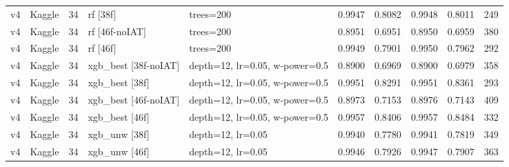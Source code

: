{\begin{longtable}{llrp{3.2cm}p{4.4cm}rrrrr}
v4 & Kaggle & 34 & rf [38f] & trees=200 & 0.9947 & 0.8082 & 0.9948 & 0.8011 & 249 \\
v4 & Kaggle & 34 & rf [46f-noIAT] & trees=200 & 0.8951 & 0.6951 & 0.8950 & 0.6959 & 380 \\
v4 & Kaggle & 34 & rf [46f] & trees=200 & 0.9949 & 0.7901 & 0.9950 & 0.7962 & 292 \\
v4 & Kaggle & 34 & xgb\_best [38f-noIAT] & depth=12, lr=0.05, w-power=0.5 & 0.8900 & 0.6969 & 0.8900 & 0.6979 & 358 \\
v4 & Kaggle & 34 & xgb\_best [38f] & depth=12, lr=0.05, w-power=0.5 & 0.9951 & 0.8291 & 0.9951 & 0.8361 & 293 \\
v4 & Kaggle & 34 & xgb\_best [46f-noIAT] & depth=12, lr=0.05, w-power=0.5 & 0.8973 & 0.7153 & 0.8976 & 0.7143 & 409 \\
v4 & Kaggle & 34 & xgb\_best [46f] & depth=12, lr=0.05, w-power=0.5 & 0.9957 & 0.8406 & 0.9957 & 0.8484 & 332 \\
v4 & Kaggle & 34 & xgb\_unw [38f] & depth=12, lr=0.05 & 0.9940 & 0.7780 & 0.9941 & 0.7819 & 349 \\
v4 & Kaggle & 34 & xgb\_unw [46f] & depth=12, lr=0.05 & 0.9946 & 0.7926 & 0.9947 & 0.7907 & 363 \\
\bottomrule
\end{longtable}
}
